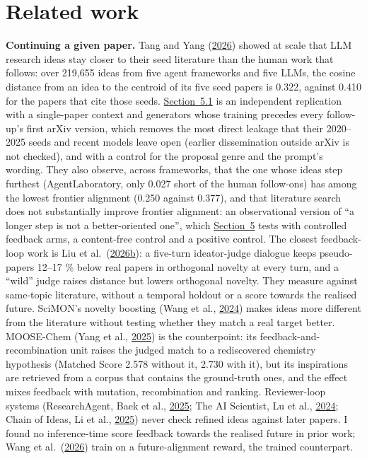 \documentclass[
  10pt,
]{article}
\begin{document}
\section{Related work}\label{sec:7}

\textbf{Continuing a given paper.} Tang
and Yang
(\hyperlink{ref-Tang2026}{2026}) showed
at scale that LLM research ideas stay
closer to their seed literature than the
human work that follows: over 219,655
ideas from five agent frameworks and
five LLMs, the cosine distance from an
idea to the centroid of its five seed
papers is 0.322, against 0.410 for the
papers that cite those seeds.
\hyperref[sec:5.1]{Section~5.1} is an
independent replication with a
single-paper context and generators
whose training precedes every
follow-up's first arXiv version, which
removes the most direct leakage that
their 2020--2025 seeds and recent models
leave open (earlier dissemination
outside arXiv is not checked), and with
a control for the proposal genre and the
prompt's wording. They also observe,
across frameworks, that the one whose
ideas step furthest (AgentLaboratory,
only 0.027 short of the human
follow-ons) has among the lowest
frontier alignment (0.250 against
0.377), and that literature search does
not substantially improve frontier
alignment: an observational version of
``a longer step is not a better-oriented
one'', which \hyperref[sec:5]{Section~5}
tests with controlled feedback arms, a
content-free control and a positive
control. The closest feedback-loop work
is Liu et
al.~(\hyperlink{ref-Liu2026b}{2026b}): a
five-turn ideator-judge dialogue keeps
pseudo-papers 12--17 \% below real
papers in orthogonal novelty at every
turn, and a ``wild'' judge raises
distance but lowers orthogonal novelty.
They measure against same-topic
literature, without a temporal holdout
or a score towards the realised future.
SciMON's novelty boosting (Wang et al.,
\hyperlink{ref-Wang2024}{2024}) makes
ideas more different from the literature
without testing whether they match a
real target better. MOOSE-Chem (Yang et
al., \hyperlink{ref-Yang2025}{2025}) is
the counterpoint: its
feedback-and-recombination unit raises
the judged match to a rediscovered
chemistry hypothesis (Matched Score
2.578 without it, 2.730 with it), but
its inspirations are retrieved from a
corpus that contains the ground-truth
ones, and the effect mixes feedback with
mutation, recombination and ranking.
Reviewer-loop systems (ResearchAgent,
Baek et al.,
\hyperlink{ref-Baek2025}{2025}; The AI
Scientist, Lu et al.,
\hyperlink{ref-Lu2024}{2024}; Chain of
Ideas, Li et al.,
\hyperlink{ref-Li2025}{2025}) never
check refined ideas against later
papers. I found no inference-time score
feedback towards the realised future in
prior work; Wang et
al.~(\hyperlink{ref-Wang2026}{2026})
train on a future-alignment reward, the
trained counterpart.
\end{document}
